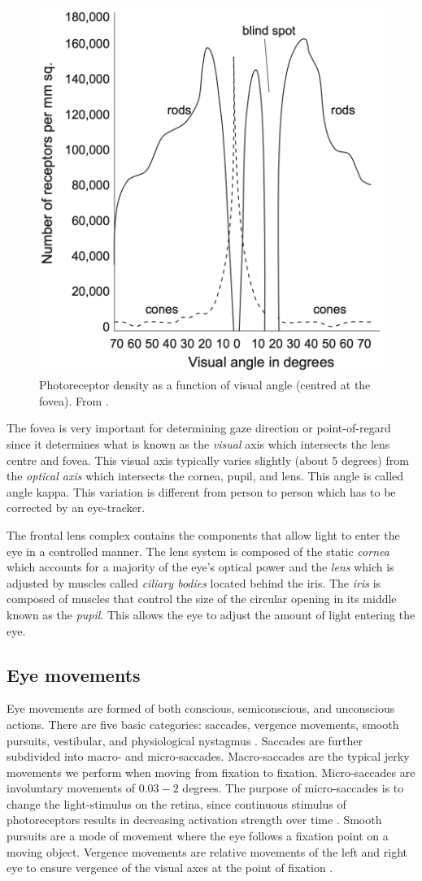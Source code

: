 \begin{figure}
    \centering
    \includegraphics[width=0.6\linewidth]{figures/retina-density.png}
    \caption{Photoreceptor density as a function of visual angle (centred at the fovea). From \parencite{methodology}.}
    \label{fig:my_label}
\end{figure}

The fovea is very important for determining gaze direction or point-of-regard since it determines what is known as the \emph{visual} axis which intersects the lens centre and fovea. This visual axis typically varies slightly (about 5 degrees) from the \emph{optical axis} which intersects the cornea, pupil, and lens. This angle is called angle kappa. This variation is different from person to person which has to be corrected by an eye-tracker.

The frontal lens complex contains the components that allow light to enter the eye in a controlled manner. The lens system is composed of the static \emph{cornea} which accounts for a majority of the eye's optical power and the \emph{lens} which is adjusted by muscles called \emph{ciliary bodies} located behind the iris. The \emph{iris} is composed of muscles that control the size of the circular opening in its middle known as the \emph{pupil}. This allows the eye to adjust the amount of light entering the eye. 

\subsection{Eye movements}
Eye movements are formed of both conscious, semiconscious, and unconscious actions. There are five basic categories: saccades, vergence movements, smooth pursuits, vestibular, and physiological nystagmus \parencite[39]{methodology}. Saccades are further subdivided into macro- and micro-saccades. Macro-saccades are the typical jerky movements we perform when moving from fixation to fixation. Micro-saccades are involuntary movements of $0.03-2$ degrees. The purpose of micro-saccades is to change the light-stimulus on the retina, since continuous stimulus of photoreceptors results in decreasing activation strength over time \parencite[44]{methodology}. Smooth pursuits are a mode of movement where the eye follows a fixation point on a moving object. Vergence movements are relative movements of the left and right eye to ensure vergence of the visual axes at the point of fixation \parencite{methodology}.


